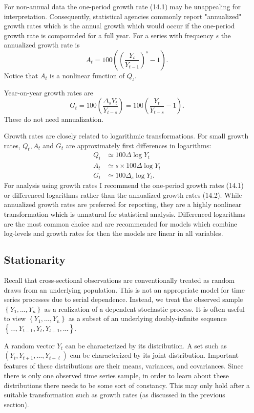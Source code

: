 \documentclass[10pt]{article}
\begin{document}
For non-annual data the one-period growth rate (14.1) may be unappealing for interpretation. Consequently, statistical agencies commonly report "annualized" growth rates which is the annual growth which would occur if the one-period growth rate is compounded for a full year. For a series with frequency $s$ the annualized growth rate is
$$
A_{t}=100\left(\left(\frac{Y_{t}}{Y_{t-1}}\right)^{s}-1\right) .
$$
Notice that $A_{t}$ is a nonlinear function of $Q_{t}$.

Year-on-year growth rates are
$$
G_{t}=100\left(\frac{\Delta_{s} Y_{t}}{Y_{t-s}}\right)=100\left(\frac{Y_{t}}{Y_{t-s}}-1\right) .
$$
These do not need annualization.

Growth rates are closely related to logarithmic transformations. For small growth rates, $Q_{t}, A_{t}$ and $G_{t}$ are approximately first differences in logarithms:
$$
\begin{aligned}
Q_{t} & \simeq 100 \Delta \log Y_{t} \\
A_{t} & \simeq s \times 100 \Delta \log Y_{t} \\
G_{t} & \simeq 100 \Delta_{s} \log Y_{t} .
\end{aligned}
$$
For analysis using growth rates I recommend the one-period growth rates (14.1) or differenced logarithms rather than the annualized growth rates (14.2). While annualized growth rates are preferred for reporting, they are a highly nonlinear transformation which is unnatural for statistical analysis. Differenced logarithms are the most common choice and are recommended for models which combine log-levels and growth rates for then the models are linear in all variables.

\subsection{Stationarity}
Recall that cross-sectional observations are conventionally treated as random draws from an underlying population. This is not an appropriate model for time series processes due to serial dependence. Instead, we treat the observed sample $\left\{Y_{1}, \ldots, Y_{n}\right\}$ as a realization of a dependent stochastic process. It is often useful to view $\left\{Y_{1}, \ldots, Y_{n}\right\}$ as a subset of an underlying doubly-infinite sequence $\left\{\ldots, Y_{t-1}, Y_{t}, Y_{t+1}, \ldots\right\}$.

A random vector $Y_{t}$ can be characterized by its distribution. A set such as $\left(Y_{t}, Y_{t+1}, \ldots, Y_{t+\ell}\right)$ can be characterized by its joint distribution. Important features of these distributions are their means, variances, and covariances. Since there is only one observed time series sample, in order to learn about these distributions there needs to be some sort of constancy. This may only hold after a suitable transformation such as growth rates (as discussed in the previous section).
\end{document}

